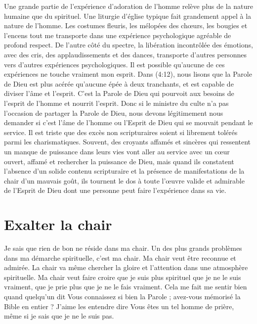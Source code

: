 Une grande partie de l'expérience d'adoration de l'homme relève plus
 de la nature humaine que du spirituel.
 Une liturgie d'église typique fait grandement appel à la nature de l'homme.
 Les costumes fleuris, les mélopées des chœurs, les bougies et l'encens
 \ocadr tout me transporte dans une expérience psychologique agréable
 de profond respect. De l'autre côté du spectre, la libération incontrôlée
 des émotions, avec des cris, des applaudissements et des dances,
 transporte d'autres personnes vers d'autres expériences psychologiques.
 Il est possible qu'aucune de ces expériences ne touche vraiment mon esprit.
 Dans (4:12), nous lisons que la Parole de Dieu
 est plus acérée qu'aucune épée à deux tranchants,
 et est capable de diviser l'âme et l'esprit.
 C'est la Parole de Dieu qui pourvoit aux besoins de l'esprit de l'homme
 et nourrit l'esprit. Donc si le ministre du culte n'a pas l'occasion
 de partager la Parole de Dieu, nous devons légitimement nous demander
 si c'est l'âme de l'homme ou l'Esprit de Dieu qui se mouvait pendant
 le service. Il est triste que des excès non scripturaires soient si
 librement tolérés parmi les charismatiques.
 Souvent, des croyants affamés et sincères qui ressentent un manque
 de puissance dans leurs vies vont aller au service avec un cœur ouvert,
 affamé et rechercher la puissance de Dieu, mais quand ils constatent
 l'absence d'un solide contenu scripturaire et la présence
 de manifestations de la chair d'un mauvais goût, ils tournent le dos
 à toute l'œuvre valide et admirable de l'Esprit de Dieu dont une personne
 peut faire l'expérience dans sa vie.


\section{Exalter la chair}

Je sais que rien de bon ne réside dans ma chair.
 Un des plus grands problèmes dans ma démarche spirituelle, c'est ma chair.
 Ma chair veut être reconnue et admirée. La chair va même chercher
 la gloire et l'attention dans une atmosphère spirituelle.
 Ma chair veut faire croire que je suis plus spirituel que je ne le suis
 vraiment, que je prie plus que je ne le fais vraiment.
 Cela me fait me sentir bien quand quelqu'un dit\frcolon{}
 \Og Vous connaissez si bien la Parole ; avez-vous mémorisé la Bible
 en entier ? \Fg{} J'aime les entendre dire\frcolon{}
 \Og Vous êtes un tel homme de prière, \Fg{} même si je sais
 que je ne le suis pas.

